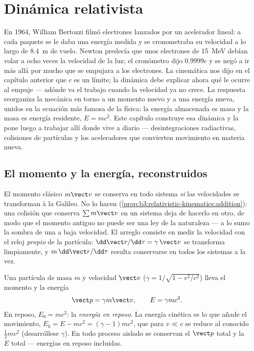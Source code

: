 \chapter{Dinámica relativista}\label{ch:b3:relativistic-dynamics}

En 1964, William Bertozzi filmó electrones lanzados por un acelerador
lineal: a cada paquete se le daba una energía medida y se cronometraba su
velocidad a lo largo de \qty{8.4}{m} de vuelo. Newton predecía que unos
electrones de \qty{15}{MeV} debían volar a ocho veces la velocidad de la luz;
el cronómetro dijo $0.9999c$ y se negó a ir más allá por mucho que se
empujara a los electrones. La cinemática nos dijo en el capítulo anterior
que $c$ es un límite; la dinámica debe explicar ahora qué le ocurre al
empuje --- adónde va el trabajo cuando la velocidad ya no crece. La
respuesta reorganiza la mecánica en torno a un momento nuevo y a una energía
nueva, unidos en la ecuación más famosa de la física: la energía almacenada
es masa y la masa es energía residente, $E = mc^2$. Este capítulo construye
esa dinámica y la pone luego a trabajar allí donde vive a diario ---
desintegraciones radiactivas, colisiones de partículas y los aceleradores
que convierten movimiento en materia nueva.

\section{El momento y la energía, reconstruidos}

\begin{remark}\label{rem:b3:relativistic-dynamics:why}
El momento clásico $m\vect v$ se conserva en todo sistema \emph{si} las
velocidades se transforman à la Galileo. No lo hacen
(\cref{prop:b3:relativistic-kinematics:addition}): una colisión que
conserva $\sum m\vect v$ en un sistema deja de hacerlo en otro, de modo que
el momento antiguo no puede ser una ley de la naturaleza --- a lo sumo la
sombra de una a baja velocidad. El arreglo consiste en medir la velocidad
con el reloj \emph{propio} de la partícula: $\dd\vect r/\dd\tau =
\gamma\,\vect v$ se transforma limpiamente, y $m\,\dd\vect r/\dd\tau$
resulta conservarse en todos los sistemas a la vez.
\end{remark}

\begin{definition}\label{def:b3:relativistic-dynamics:momentum-energy}
Una partícula de masa $m$ y velocidad $\vect v$ ($\gamma = 1/\sqrt{1 -
v^2/c^2}$) lleva el momento y la energía
\[
\vect p = \gamma m\vect v , \qquad
E = \gamma mc^2 .
\]
En reposo, $E_0 = mc^2$: la \emph{energía en reposo}. La energía cinética es
lo que añade el movimiento, $E_k = E - mc^2 = (\gamma - 1)mc^2$, que para $v
\ll c$ se reduce al conocido $\tfrac12 mv^2$ (desarróllese $\gamma$). En todo
proceso aislado se conservan el $\vect p$ total y la $E$ total --- energías
en reposo incluidas.
\end{definition}

